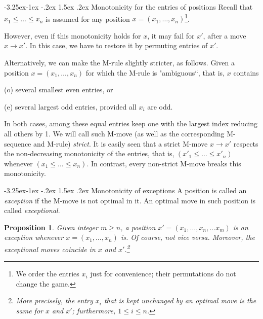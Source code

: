 \documentclass[10pt]{article}
\makeatletter
\renewcommand\subsection{\@startsection{subsection}{2}{\z@}
{-3.25ex\@plus -1ex \@minus -.2ex}
{1.5ex \@plus .2ex}
{\normalfont\normalsize\bfseries\boldmath}}
\newtheorem{proposition}{Proposition}
\theoremstyle{definition}
\makeatother
\begin{document}
\subsection{Monotonicity for the entries of positions} 
Recall that  $x_1 \leq \ldots \leq x_n$  is assumed 
for any position  $x = (x_1, \ldots, x_n)$\footnote{We order the entries $x_i$ 
just for convenience;
their permutations do not change the game.}. 
 
However, even if this monotonicity  holds for  $x$, 
it may fail for $x'$, after a move $x \to x'$. 
In this case, we have to restore it 
by permuting entries of  $x'$.

Alternatively, we can make the M-rule slightly stricter, as follows. 
Given a position $x = (x_1, \ldots, x_n)$ 
for which the M-rule is "ambiguous``, 
that is, $x$ contains 

\medskip

(o) several  smallest even entries, or 

\smallskip

(e) several largest odd entries, provided all $x_i$  are odd. 

\medskip

In both cases, among these equal entries 
keep one with the largest index reducing all others by 1.
We will call such M-move 
(as well as the corresponding M-sequence and M-rule) 
{\em strict}.
It is easily seen that a strict M-move $x \to x'$ 
respects the non-decreasing monotonicity of the entries, that is,  
$(x'_1 \leq  \ldots \leq x'_n)$  whenever 
$(x_1 \leq  \ldots \leq x_n)$.
In contrast, every non-strict M-move breaks this monotonicity.   

\subsection{Monotonicity of exceptions}
\label{ss11a} 
A position is called an {\em exception} 
if the M-move is not optimal in it.  
An optimal move in such position is called 
{\em exceptional}. 

\begin{proposition} 
Given integer  $m \geq n$, a position    
$x' = (x_1, \ldots, x_n, \dots x_m)$  
is an exception  whenever   
$x = (x_1, \ldots, x_n)$  is.  
Of course, not vice versa. 
Moreover, the exceptional moves
coincide  in  $x$  and  $x'$.\footnote{More precisely, the entry 
$x_i$  that is kept unchanged by an optimal move 
is the same for $x$ and $x'$; 
furthermore,  $1 \leq i \leq n$.}
\end{proposition} 
\end{document}
